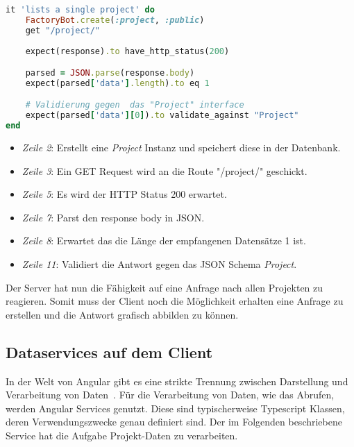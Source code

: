 \begin{lstlisting}[language=Ruby,float=h!,caption={Test überprüft, ob bei Anfrage der Route '/project/' eine Antwort vom Typ Project folgt}, label={lst:example:controller-test}]
it 'lists a single project' do
	FactoryBot.create(:project, :public)
	get "/project/"
	
	expect(response).to have_http_status(200)

	parsed = JSON.parse(response.body)
	expect(parsed['data'].length).to eq 1

	# Validierung gegen  das "Project" interface
	expect(parsed['data'][0]).to validate_against "Project"
end
\end{lstlisting}


\begin{itemize}
	\setlength\itemsep{-1em}
	\item \emph{Zeile 2}: Erstellt eine \emph{Project} Instanz und speichert diese in der Datenbank.
	\item \emph{Zeile 3}: Ein GET Request wird an die Route "/project/" geschickt.
	\item \emph{Zeile 5}: Es wird der HTTP Status 200 erwartet. 
	\item \emph{Zeile 7}: Parst den response body in JSON.
	\item \emph{Zeile 8}: Erwartet das die Länge der empfangenen Datensätze 1 ist.
	\item \emph{Zeile 11}: Validiert die Antwort gegen das JSON Schema \emph{Project}.
\end{itemize}

Der Server hat nun die Fähigkeit auf eine Anfrage nach allen Projekten zu reagieren.
Somit muss der Client noch die Möglichkeit erhalten eine Anfrage zu erstellen und die Antwort grafisch abbilden zu können.

\subsection{Dataservices auf dem Client}
\label{sec:requirements:example:service}
In der Welt von Angular gibt es eine strikte Trennung zwischen Darstellung und Verarbeitung von Daten~\cite{angular-service}.
Für die Verarbeitung von Daten, wie das Abrufen, werden Angular Services genutzt. Diese sind typischerweise Typescript Klassen,
deren Verwendungszwecke genau definiert sind. Der im Folgenden beschriebene Service hat die Aufgabe Projekt-Daten zu verarbeiten.

